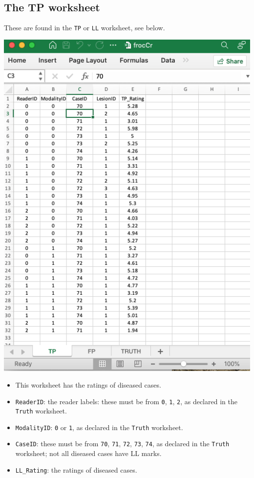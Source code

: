 \documentclass[
]{book}
\providecommand{\tightlist}{%
  \setlength{\itemsep}{0pt}\setlength{\parskip}{0pt}}
\begin{document}
\hypertarget{the-tp-worksheet}{%
\subsection{The TP worksheet}\label{the-tp-worksheet}}

These are found in the \texttt{TP} or \texttt{LL} worksheet, see below.

\includegraphics[width=1\textwidth,height=\textheight]{images/software-details/frocCrTp.png}

\begin{itemize}
\tightlist
\item
  This worksheet has the ratings of diseased cases.
\item
  \texttt{ReaderID}: the reader labels: these must be from \texttt{0}, \texttt{1}, \texttt{2}, as declared in the \texttt{Truth} worksheet.
\item
  \texttt{ModalityID}: \texttt{0} or \texttt{1}, as declared in the \texttt{Truth} worksheet.
\item
  \texttt{CaseID}: these must be from \texttt{70}, \texttt{71}, \texttt{72}, \texttt{73}, \texttt{74}, as declared in the \texttt{Truth} worksheet; not all diseased cases have LL marks.\\
\item
  \texttt{LL\_Rating}: the ratings of diseased cases.
\end{itemize}
\end{document}
